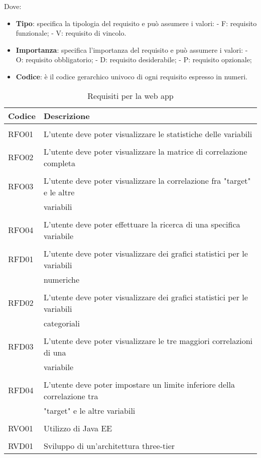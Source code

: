 Dove:
\begin{itemize}
	\item \textbf{Tipo}: specifica la tipologia del requisito e può assumere i valori:
	\subitem - F: requisito funzionale;
	\subitem - V: requisito di vincolo.
	\item \textbf{Importanza}: specifica l'importanza del requisito e può assumere i valori:
	\subitem - O: requisito obbligatorio;
	\subitem - D: requisito desiderabile;
	\subitem - P: requisito opzionale; 
	\item  \textbf{Codice}: è il codice gerarchico univoco di ogni requisito espresso in numeri.
\end{itemize} 
\clearpage
\begin{table}[!h] %
	\caption{Requisiti per la web app}
	\label{tab:requisiti-app}
	\centering
	\begin{tabular}{ l | l }
		\textbf{Codice} & \textbf{Descrizione}\\
		\hline
		\hline
		\\[-2.5mm]
		RFO01 & L'utente deve poter visualizzare le statistiche delle variabili \\
		\hline
		\\[-2.5mm]
		RFO02 & L'utente deve poter visualizzare la matrice di correlazione completa \\
		\hline
		\\[-2.5mm]
		RFO03 & L'utente deve poter visualizzare la correlazione fra "target" e le altre \\ & variabili \\
		\hline
		\\[-2.5mm]
		RFO04 & L'utente deve poter effettuare la ricerca di una specifica variabile \\
		\hline
		\hline
		\\[-2.5mm]
		RFD01 & L'utente deve poter visualizzare dei grafici statistici per le variabili \\ & numeriche \\
		\hline
		\\[-2.5mm]
		RFD02 & L'utente deve poter visualizzare dei grafici statistici per le variabili \\ & categoriali \\
		\hline
		\\[-2.5mm]
		RFD03 & L'utente deve poter visualizzare le tre maggiori correlazioni di una \\ 
		& variabile \\
		\hline
		\\[-2.5mm]
		RFD04 & L'utente deve poter impostare un limite inferiore della correlazione tra \\ & "target" e le altre variabili \\
		\hline
		\hline
		\\[-2.5mm]
		RVO01 & Utilizzo di Java EE \\
		\hline
		\hline
		\\[-2.5mm]
		RVD01 & Sviluppo di un'architettura three-tier \\
		\hline
		\end{tabular}
\end{table}%

